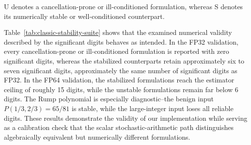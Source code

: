 \documentclass[manuscript, screen]{acmart}
\begin{document}
\begin{table}[t]
\begin{minipage}[t]{0.49\textwidth}
  \end{minipage}

  \vspace{0.25em}

  \footnotesize
  U denotes a cancellation-prone or ill-conditioned formulation, whereas S
  denotes its numerically stable or well-conditioned counterpart.
\end{table}

Table~\ref{tab:classic-stability-suite} shows that the examined numerical validity described by the significant digits behaves as intended. In the FP32 validation, every cancellation-prone or ill-conditioned formulation is reported with zero significant digits, whereas the stabilized counterparts retain approximately six to seven significant digits, approximately the same number of significant digits as FP32. In the FP64 validation, the stabilized formulations reach the estimator ceiling of roughly 15 digits, while the unstable formulations remain far below 6 digits. The Rump polynomial is especially diagnostic{--}the benign input $P(1/3,2/3)=65/81$ is stable, while the large-integer input loses all reliable digits. These results demonstrate the validity of our implementation while serving as a calibration check that the scalar stochastic-arithmetic path distinguishes algebraically equivalent but numerically different formulations.
\end{document}
